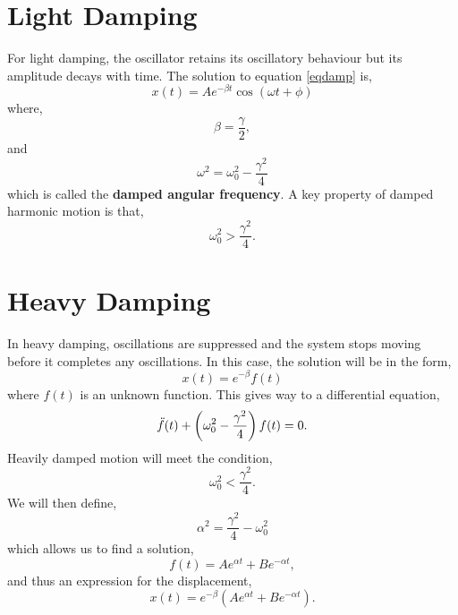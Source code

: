 \documentclass{book}
\begin{document}
\section{Light Damping}
For light damping, the oscillator retains its oscillatory behaviour but its amplitude decays with time. The solution to equation \eqref{eqdamp} is,
\begin{equation}
    x(t) = Ae^{-\beta t }\cos(\omega t + \phi)
\end{equation}
where,
\begin{equation}
    \beta = \frac{\gamma}{2},
\end{equation}
and
\begin{equation}
    \omega^2 = \omega_0^2 - \frac{\gamma^2}{4}
\end{equation}
which is called the \textbf{damped angular frequency}. A key property of damped harmonic motion is that,
\begin{equation}
    \omega_0^2 > \frac{\gamma^2}{4}.
\end{equation}
\section{Heavy Damping}
In heavy damping, oscillations are suppressed and the system stops moving before it completes any oscillations. In this case, the solution will be in the form,
\begin{equation}
    x(t) = e^{-\beta}f(t)
\end{equation}
where $f(t)$ is an unknown function. This gives way to a differential equation,
\begin{equation}
    \Ddot{f}(t) + \left(\omega_0^2 - \frac{\gamma^2}{4}\right)f(t) = 0.
\end{equation}
Heavily damped motion will meet the condition,
\begin{equation}
    \omega_0^2<\frac{\gamma^2}{4}.
\end{equation}
We will then define,
\begin{equation}
    \alpha^2 = \frac{\gamma^2}{4} - \omega_0^2
\end{equation}
which allows us to find a solution,
\begin{equation}
    f(t) = Ae^{\alpha t} + Be^{-\alpha t},
\end{equation}
and thus an expression for the displacement,
\begin{equation}
    x(t) = e^{-\beta}\left(Ae^{\alpha t} + Be^{-\alpha t}\right).
\end{equation}
\end{document}
